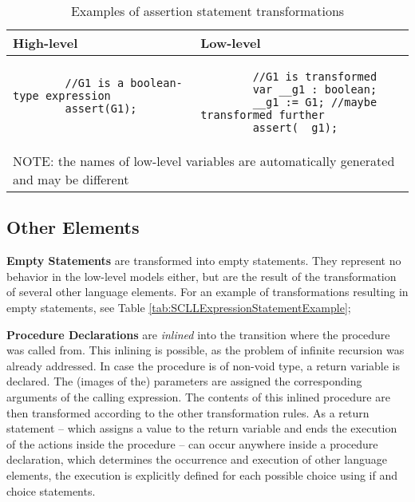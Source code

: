 \begin{table}[ht]
	\footnotesize
	\centering
	\begin{tabular}{ p{7cm} p{7cm} }
		\toprule
		High-level & Low-level \\
		\midrule
		\begin{lstlisting}
		//G1 is a boolean-type expression
		assert(G1);
		
		\end{lstlisting} & 
		\begin{lstlisting}
		//G1 is transformed
		var __g1 : boolean;
		__g1 := G1;	//maybe transformed further
		assert(__g1);\end{lstlisting} \\
		\bottomrule
		\multicolumn{2}{l}{NOTE: the names of low-level variables are automatically generated and may be different}
	\end{tabular}
	\caption{Examples of assertion statement transformations}
	\label{tab:SCLLAssertionStatementExample}
\end{table}

\subsection{Other Elements}

\bigskip
\textbf{Empty Statements} are transformed into empty statements. They represent no behavior in the low-level models either, but are the result of the transformation of several other language elements. For an example of transformations resulting in empty statements, see Table \ref{tab:SCLLExpressionStatementExample};

\bigskip
\textbf{Procedure Declarations} are \textit{inlined} into the transition where the procedure was called from. This inlining is possible, as the problem of infinite recursion was already addressed. In case the procedure is of non-void type, a return variable is declared. The (images of the) parameters are assigned the corresponding arguments of the calling expression. The contents of this inlined procedure are then transformed according to the other transformation rules. As a return statement -- which assigns a value to the return variable and ends the execution of the actions inside the procedure -- can occur anywhere inside a procedure declaration, which determines the occurrence and execution of other language elements, the execution is explicitly defined for each possible choice using if and choice statements.

